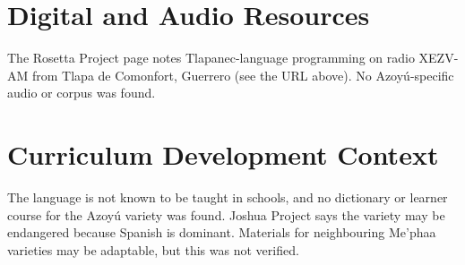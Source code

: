\documentclass[12pt]{article}
\begin{document}
\section{Digital and Audio Resources}
The Rosetta Project page notes Tlapanec-language programming on radio XEZV-AM from Tlapa de Comonfort, Guerrero (see the URL above). No Azoy\'u-specific audio or corpus was found.

\section{Curriculum Development Context}
The language is not known to be taught in schools, and no dictionary or learner course for the Azoy\'u variety was found. Joshua Project says the variety may be endangered because Spanish is dominant. Materials for neighbouring Me'phaa varieties may be adaptable, but this was not verified.
\end{document}
